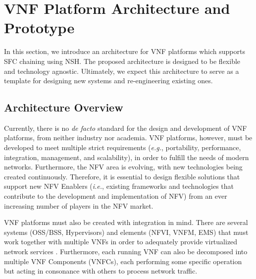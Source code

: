 \section{VNF Platform Architecture and Prototype} \label{ARCH}

In this section, we introduce an architecture for VNF platforms which supports SFC chaining using NSH. The proposed architecture is designed to be flexible and technology agnostic. Ultimately, we expect this architecture to serve as a template for designing new systems and re-engineering existing ones.

\subsection{Architecture Overview}

Currently, there is no \textit{de facto} standard for the design and development of VNF platforms, from neither industry nor academia. VNF platforms, however, must be developed to meet multiple strict requirements (\textit{e.g.}, portability, performance, integration, management, and scalability), in order to fulfill the needs of modern networks. Furthermore, the NFV area is evolving, with new technologies being created continuously. Therefore, it is essential to design flexible solutions that support new NFV Enablers (\textit{i.e.}, existing frameworks and technologies that contribute to the development and implementation of NFV) from an ever increasing number of players in the NFV market.

VNF platforms must also be created with integration in mind. There are several systems (OSS/BSS, Hypervisors) and elements (NFVI, VNFM, EMS) that must work together with multiple VNFs in order to adequately provide virtualized network services \cite{GS-2014}. Furthermore, each running VNF can also be decomposed into multiple VNF Components (VNFCs), each performing some specific operation but acting in consonance with others to process network traffic.



